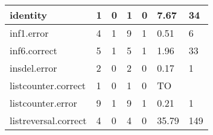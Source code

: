 \begin{table}
{\begin{tabular}{|l|l|l|l|l|l|l|}
    identity                                                 & 1                                     & 0                                          & 1                                     & 0                                          & 7.67                                                            & 34                                       \\ \hline
    inf1.error                                               & 4                                     & 1                                          & 9                                     & 1                                          & 0.51                                                            & 6                                        \\ \hline
    inf6.correct                                             & 5                                     & 1                                          & 5                                     & 1                                          & 1.96                                                            & 33                                       \\ \hline
    insdel.error                                             & 2                                     & 0                                          & 2                                     & 0                                          & 0.17                                                            & 1                                        \\ \hline
    listcounter.correct                                      & 1                                     & 0                                          & 1                                     & 0                                          & TO                                                              & ~                                        \\ \hline
    listcounter.error                                        & 9                                     & 1                                          & 9                                     & 1                                          & 0.21                                                            & 1                                        \\ \hline
    listreversal.correct                                     & 4                                     & 0                                          & 4                                     & 0                                          & 35.79                                                           & 149                                      \\ \hline

\end{tabular}}
\end{table}
